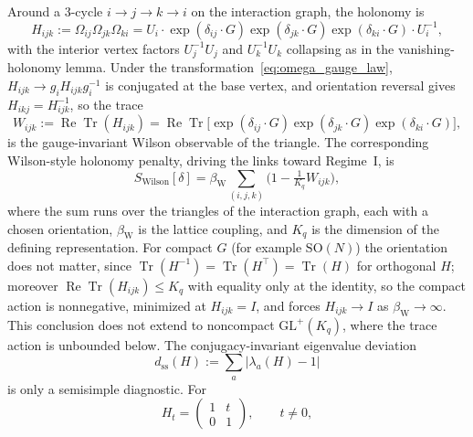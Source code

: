 \documentclass[11pt]{article}
\begin{document}
Around a 3-cycle $i\to j\to k\to i$ on the interaction graph, the holonomy is
\begin{equation}
H_{ijk}
:= \Omega_{ij}\Omega_{jk}\Omega_{ki}
= U_i \cdot \exp(\delta_{ij}\cdot G) \exp(\delta_{jk}\cdot G) \exp(\delta_{ki}\cdot G) \cdot U_i^{-1},
\label{eq:discrete_holonomy}
\end{equation}
with the interior vertex factors $U_j^{-1}U_j$ and $U_k^{-1}U_k$ collapsing as in the vanishing-holonomy lemma. Under the transformation~\eqref{eq:omega_gauge_law}, $H_{ijk} \to g_i H_{ijk} g_i^{-1}$ is conjugated at the base vertex, and orientation reversal gives $H_{ikj} = H_{ijk}^{-1}$, so the trace
\begin{equation}
W_{ijk} := \operatorname{Re}\operatorname{Tr}(H_{ijk})
= \operatorname{Re}\operatorname{Tr}\big[\exp(\delta_{ij}\cdot G) \exp(\delta_{jk}\cdot G) \exp(\delta_{ki}\cdot G)\big],
\label{eq:wilson_observable}
\end{equation}
is the gauge-invariant Wilson observable of the triangle. The corresponding Wilson-style holonomy penalty, driving the links toward Regime~I, is
\begin{equation}
S_{\mathrm{Wilson}}[\delta]
= \beta_{\mathrm{W}} \sum_{(i,j,k)} \Big(1 - \tfrac{1}{K_q} W_{ijk}\Big),
\label{eq:wilson_action}
\end{equation}
where the sum runs over the triangles of the interaction graph, each with a chosen orientation, $\beta_{\mathrm{W}}$ is the lattice coupling, and $K_q$ is the dimension of the defining representation. For compact $G$ (for example $\mathrm{SO}(N)$) the orientation does not matter, since $\operatorname{Tr}(H^{-1}) = \operatorname{Tr}(H^\top) = \operatorname{Tr}(H)$ for orthogonal $H$; moreover $\operatorname{Re}\operatorname{Tr}(H_{ijk})\le K_q$ with equality only at the identity, so the compact action is nonnegative, minimized at $H_{ijk}=I$, and forces $H_{ijk} \to I$ as $\beta_{\mathrm{W}} \to \infty$. This conclusion does not extend to noncompact $\mathrm{GL}^+(K_q)$, where the trace action is unbounded below. The conjugacy-invariant eigenvalue deviation
\begin{equation}
d_{\mathrm{ss}}(H):=\sum_a|\lambda_a(H)-1|
\end{equation}
is only a semisimple diagnostic. For
\begin{equation}
H_t=\begin{pmatrix}1&t\\0&1\end{pmatrix},\qquad t\ne0,
\end{equation}
\end{document}

